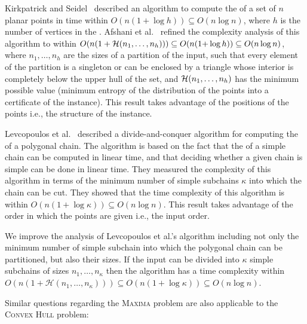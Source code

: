 Kirkpatrick and
Seidel~\cite{1986-JCom-TheUltimatePlanarConvexHullAlgorithm-KirkpatrickSeidel}
described an algorithm to compute the {} of a set of
$n$ planar points in time within $O(n(1+\log h))\subseteq O(n\log n)$,
where $h$ is the number of vertices in the {}. Afshani
et
al.~\cite{2009-FOCS-InstanceOptimalGeometricAlgorithms-AfshaniBarbayChan}
refined the complexity analysis of this algorithm to within
$O(n(1+{\cal H}(n_1,\ldots,n_h)))\subseteq O(n(1{+}\log h)) \subseteq
O(n\log{n})$, where $n_1, \dots, n_h$ are the sizes of a partition of
the input, such that every element of the partition is a singleton or
can be enclosed by a triangle whose interior is completely below the
upper hull of the set, and ${\cal H}(n_1,\ldots,n_h)$ has the minimum
possible value (minimum entropy of the distribution of the points into
a certificate of the instance). This result takes advantage of the
positions of the points i.e., the structure of the instance.

Levcopoulos et
al.~\cite{2002-SWAT-AdaptiveAlgorithmsForConstructingConvexHullsAndTriangulationsOfPolygonalChains-LevcopoulosLingasMitchell}
described a divide-and-conquer algorithm for computing the {} of a polygonal chain. The algorithm is based on the fact
that the {} of a simple chain can be computed in
linear time, and that deciding whether a given chain is simple can be
done in linear time. They measured the complexity of this algorithm in
terms of the minimum number of simple subchains $\kappa$ into which
the chain can be cut. They showed that the time complexity of this
algorithm is within $O(n(1{+}\log{\kappa})) \subseteq O(n\log{n})$.
%
This result takes advantage of the order in which the points are given i.e., the input order.

We improve the analysis of Levcopoulos et al.'s algorithm including
not only the minimum number of simple subchain into which the
polygonal chain can be partitioned, but also their sizes. If the input
can be divided into $\kappa$ simple subchains of sizes
$n_1, \dots, n_{\kappa}$ then the algorithm has a time
complexity within
$O(n(1+\mathcal{H}(n_1, \dots, n_{\kappa}))) \subseteq
O(n(1{+}\log{\kappa})) \subseteq O(n\log{n})$.

Similar questions regarding the \textsc{Maxima} problem are also
applicable to the \textsc{Convex Hull} problem:

